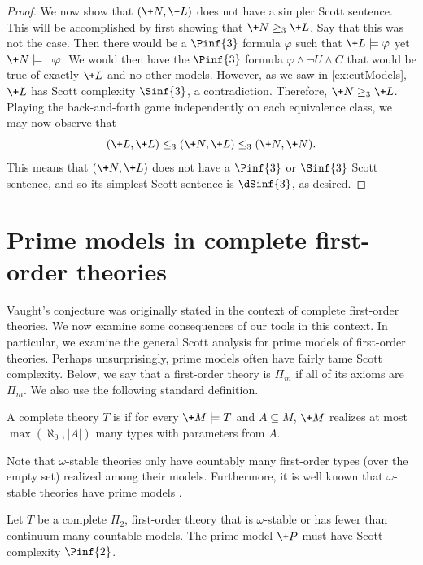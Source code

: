 \documentclass[10pt,a4paper]{amsart}
\renewcommand{\-}{\text{-}}
\begin{document}
\begin{proof}
We now show that $(\+N,\+L)$ does not have a simpler Scott sentence.
This will be accomplished by first showing that $\+N\geq_3 \+L$.
Say that this was not the case.
Then there would be a $\Pinf{3}$ formula $\varphi$ such that $\+L\models\varphi$ yet $\+N\models \lnot \varphi$.
We would then have the $\Pinf{3}$ formula $\varphi\land\lnot U\land C$ that would be true of exactly $\+L$ and no other models.
However, as we saw in \cref{ex:cutModels}, $\+L$ has Scott complexity $\Sinf{3}$, a contradiction.
Therefore, $\+N\geq_3 \+L$.
Playing the back-and-forth game independently on each equivalence class, we may now observe that
\[(\+L,\+L)\leq_3(\+N,\+L)\leq_3(\+N,\+N).\]
This means that $(\+N,\+L)$ does not have a $\Pinf{3}$ or $\Sinf{3}$ Scott sentence, and so its simplest Scott sentence is $\dSinf{3}$, as desired.
\end{proof}

\section{Prime models in complete first-order theories}
Vaught's conjecture was originally stated in the context of complete first-order theories.
We now examine some consequences of our tools in this context.
In particular, we examine the general Scott analysis for prime models of first-order theories.
Perhaps unsurprisingly, prime models often have fairly tame Scott complexity.
Below, we say that a first-order theory is $\Pi_m$ if all of its axioms are $\Pi_m$.
We also use the following standard definition.

\begin{definition}
    A complete theory $T$ is  if for every $\+M\models T$ and $A\subseteq M$, $\+M$ realizes at most $\max(\aleph_0,|A|)$ many types with parameters from $A$. 
\end{definition}

Note that $\omega$-stable theories only have countably many first-order types (over the empty set) realized among their models.
Furthermore, it is well known that $\omega$-stable theories have prime models \cite[Chapter 7]{marker2002}.

\begin{proposition}\label{prop:Pi2PrimeModel}
Let $T$ be a complete $\Pi_2$, first-order theory that is $\omega$-stable or has fewer than continuum many countable models.
The prime model $\+P$ must have Scott complexity $\Pinf{2}$.
\end{proposition}
\end{document}
